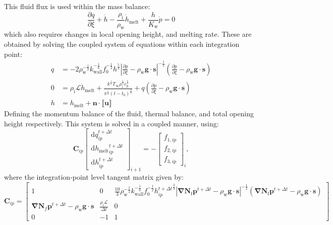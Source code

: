 \documentclass[3p]{elsarticle} %
\begin{document}
This fluid flux is used within the mass balance:
\begin{equation}
    \frac{\partial q}{\partial \xi} + \dot{h} - \frac{\rho_{\text{i}}}{\rho_{\text{w}}} \dot{h}_{\text{melt}}+ \frac{h}{K_{\text{w}}}\dot{p} = 0 \label{eq:MassBalance}
\end{equation}
which also requires changes in local opening height, and melting rate. These are obtained by solving the coupled system of equations within each integration point:
\begin{align}
    q &= -2\rho_{\text{w}}^{-\frac{1}{2}}k_{\text{wall}}^{-\frac{1}{6}}f_0^{-\frac{1}{2}} h^{\frac{5}{3}}\left|\frac{\partial p}{\partial \xi}-\rho_{\text{w}} \mathbf{g} \cdot \mathbf{s}\right|^{-\frac{1}{2}}\left(\frac{\partial p}{\partial \xi}-\rho_{\text{w}} \mathbf{g} \cdot \mathbf{s}\right) \label{SIeq:qx}\\
    0&=\rho_{\text{i}} \mathcal{L}\dot{h}_{\text{melt}} + \frac{k^{\frac{1}{2}}T_\infty \rho_{\text{i}}^{\frac{1}{2}}c_{\mathrm{p}}^{\frac{1}{2}}}{\pi^{\frac{1}{2}}\left(t-t_0\right)^{\frac{3}{2}}}  + q \left(\frac{\partial p}{\partial \xi}-\rho_{\text{w}} \mathbf{g} \cdot \mathbf{s}\right) \label{SIeq:hmelt}\\
    h &= h_{\text{melt}} + \mathbf{n}\cdot\llbracket \mathbf{u} \rrbracket\label{SIeq:htotal}
\end{align}
Defining the momentum balance of the fluid, thermal balance, and total opening height respectively. This system is solved in a coupled manner, using:
\begin{equation}
    \bm{C}_{ip} \begin{bmatrix} \mathrm{d}{q}_{ip}^{t+\Delta t} \\ \mathrm{d} {h_{\text{melt}}}_{ip}^{t+\Delta t} \\ \mathrm{d} h^{t+\Delta t}_{ip} \end{bmatrix}_{i+1} = - \begin{bmatrix} f_{1,ip} \\ f_{2,ip} \\ f_{3,ip} \end{bmatrix}_i,
\end{equation}
where the integration-point level tangent matrix given by:
\begin{equation}
    \bm{C}_{ip} = \begin{bmatrix} 1 & 0 & \frac{10}{3}\rho_{\text{w}}^{-\frac{1}{2}}k_{\text{wall}}^{-\frac{1}{6}}f_0^{-\frac{1}{2}} {h_{ip}^{t+\Delta t}}^{\frac{2}{3}}\left|\bm{\nabla}\mathbf{N}_\mathrm{f} \mathbf{p}^{t+\Delta t}-\rho_{\text{w}} \mathbf{g} \cdot \mathbf{s}\right|^{-\frac{1}{2}}\left(\bm{\nabla}\mathbf{N}_\mathrm{f} \mathbf{p}^{t+\Delta t}-\rho_{\text{w}} \mathbf{g} \cdot \mathbf{s}\right) \\
    \bm{\nabla}\mathbf{N}_f \mathbf{p}^{t+\Delta t}-\rho_{\text{w}} \mathbf{g} \cdot \mathbf{s} & \frac{\rho_{\text{i}} \mathcal{L}}{\Delta t} & 0 \\
    0 & -1 & 1\end{bmatrix} \label{SIeq:CMat}
\end{equation}
\end{document}
